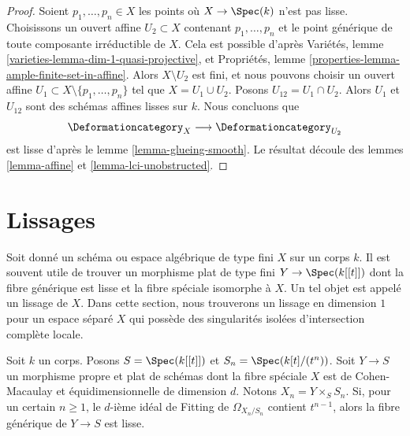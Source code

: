 \begin{proof}
Soient $p_1, \ldots, p_n \in X$ les points où $X \to \Spec(k)$
n'est pas lisse. Choisissons un ouvert affine $U_2 \subset X$ contenant
$p_1, \ldots, p_n$ et le point générique de toute composante
irréductible de $X$. Cela est possible d'après
Variétés, lemme \ref{varieties-lemma-dim-1-quasi-projective},
et Propriétés, lemme \ref{properties-lemma-ample-finite-set-in-affine}.
Alors $X \setminus U_2$ est fini, et nous pouvons choisir un ouvert affine
$U_1 \subset X \setminus \{p_1, \ldots, p_n\}$ tel que
$X = U_1 \cup U_2$. Posons $U_{12} = U_1 \cap U_2$.
Alors $U_1$ et $U_{12}$ sont des schémas affines lisses sur $k$.
Nous concluons que
$$
\Deformationcategory_X \longrightarrow \Deformationcategory_{U_2}
$$
est lisse d'après le lemme \ref{lemma-glueing-smooth}.
Le résultat découle des lemmes \ref{lemma-affine} et \ref{lemma-lci-unobstructed}.
\end{proof}




\section{Lissages}
\label{section-smoothing}

\noindent
Soit donné un schéma ou espace algébrique de type fini $X$ sur un corps $k$.
Il est souvent utile de trouver un morphisme plat de type fini $Y \to \Spec(k[[t]])$
dont la fibre générique est lisse et la fibre spéciale isomorphe à $X$.
Un tel objet est appelé un lissage de $X$. Dans cette section, nous trouverons
un lissage en dimension $1$ pour un espace séparé $X$ qui possède des singularités
isolées d'intersection complète locale.

\begin{lemma}
\label{lemma-criterion-smoothing}
Soit $k$ un corps. Posons $S = \Spec(k[[t]])$ et
$S_n = \Spec(k[t]/(t^n))$. Soit $Y \to S$ un morphisme propre et plat
de schémas dont la fibre spéciale $X$ est de Cohen-Macaulay et
équidimensionnelle de dimension $d$. Notons $X_n = Y \times_S S_n$.
Si, pour un certain $n \geq 1$, le $d$-ième idéal de Fitting de $\Omega_{X_n/S_n}$
contient $t^{n - 1}$, alors la fibre générique de $Y \to S$ est lisse.
\end{lemma}

